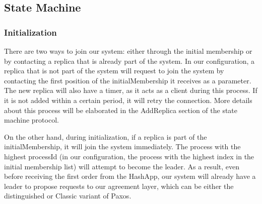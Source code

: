 \documentclass[sigconf]{acmart}
\begin{document}
\subsection{State Machine}
\subsubsection{Initialization}
There are two ways to join our system: either through the initial membership or by contacting a replica that is already part of the system. In our configuration, a replica that is not part of the system will request to join the system by contacting the first position of the initialMembership it receives as a parameter. The new replica will also have a timer, as it acts as a client during this process. If it is not added within a certain period, it will retry the connection. More details about this process will be elaborated in the AddReplica section of the state machine protocol.

On the other hand, during initialization, if a replica is part of the initialMembership, it will join the system immediately. The process with the highest processId (in our configuration, the process with the highest index in the initial membership list) will attempt to become the leader. As a result, even before receiving the first order from the HashApp, our system will already have a leader to propose requests to our agreement layer, which can be either the distinguished or Classic variant of Paxos.
\end{document}
